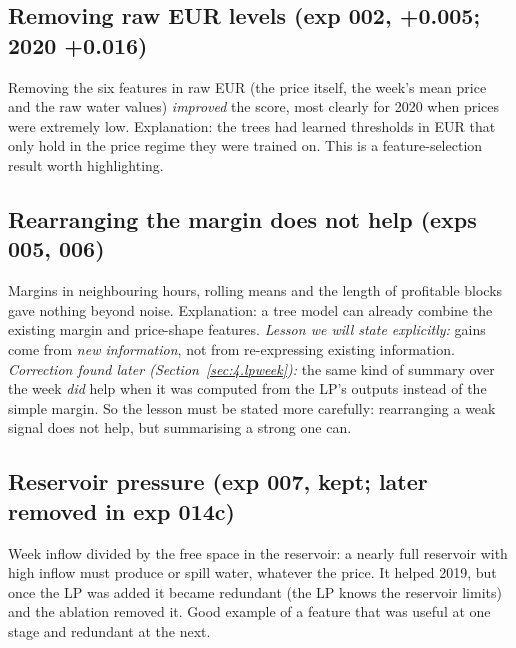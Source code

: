 

\subsection{Removing raw EUR levels (exp 002, +0.005; 2020 +0.016)}\label{sec:4.3}

\begin{disposition}
Removing the six features in raw EUR (the price itself, the week's mean price and the raw water values) \emph{improved} the score, most clearly for 2020 when prices were extremely low. Explanation: the trees had learned thresholds in EUR that only hold in the price regime they were trained on. This is a feature-selection result worth highlighting.
\end{disposition}



\subsection{Rearranging the margin does not help (exps 005, 006)}\label{sec:4.4}

\begin{disposition}
Margins in neighbouring hours, rolling means and the length of profitable blocks gave nothing beyond noise. Explanation: a tree model can already combine the existing margin and price-shape features. \emph{Lesson we will state explicitly:} gains come from \emph{new information}, not from re-expressing existing information. \emph{Correction found later (Section~\ref{sec:4.lpweek}):} the same kind of summary over the week \emph{did} help when it was computed from the LP's outputs instead of the simple margin. So the lesson must be stated more carefully: rearranging a weak signal does not help, but summarising a strong one can.
\end{disposition}



\subsection{Reservoir pressure (exp 007, kept; later removed in exp 014c)}\label{sec:4.5}

\begin{disposition}
Week inflow divided by the free space in the reservoir: a nearly full reservoir with high inflow must produce or spill water, whatever the price. It helped 2019, but once the LP was added it became redundant (the LP knows the reservoir limits) and the ablation removed it. Good example of a feature that was useful at one stage and redundant at the next.
\end{disposition}


